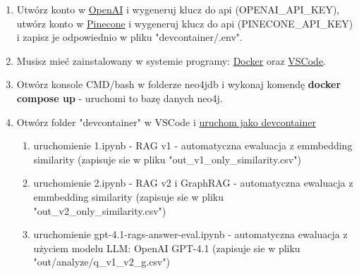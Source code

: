 \documentclass[
a4paper,
12pt,
]{article}
\begin{document}
\begin{appendices}
\begin{enumerate}
    \item Utwórz konto w \href{https://platform.openai.com/login}{OpenAI} i wygeneruj klucz do api (OPENAI\_API\_KEY), utwórz konto w \href{https://www.pinecone.io}{Pinecone} i wygeneruj klucz do api (PINECONE\_API\_KEY) i zapisz je odpowiednio w pliku "devcontainer/.env".
    \item Musisz mieć zainstalowany w systemie programy: \href{https://docs.docker.com/desktop/setup/install/windows-install}{Docker} oraz \href{https://code.visualstudio.com/Download}{VSCode}.
    \item Otwórz konsole CMD/bash w folderze neo4jdb  
    i wykonaj komendę \textbf{docker compose up} - uruchomi to bazę danych neo4j.
    \item Otwórz folder "devcontainer" w VSCode i \href{https://code.visualstudio.com/docs/devcontainers/containers}{uruchom jako devcontainer}
    \begin{enumerate}[label=4.\arabic*.]
        \item uruchomienie 1.ipynb - RAG v1 - automatyczna ewaluacja z emmbedding similarity (zapisuje sie w pliku "out\_v1\_only\_similarity.csv")
        \item uruchomienie 2.ipynb - RAG v2 i GraphRAG - automatyczna ewaluacja z emmbedding similarity (zapisuje sie w pliku "out\_v2\_only\_similarity.csv")
        \item uruchomienie gpt-4.1-rags-answer-eval.ipynb - automatyczna ewaluacja z użyciem modelu LLM: OpenAI GPT-4.1 (zapisuje sie w pliku "out/analyze/q\_v1\_v2\_g.csv")
    \end{enumerate}
\end{enumerate}

\end{appendices}
\end{document}
